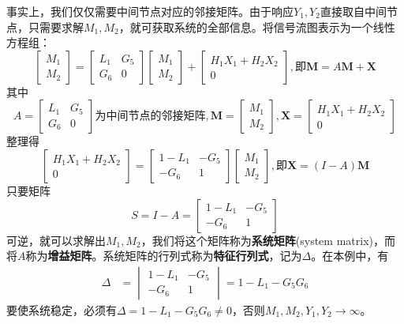 \begin{example}
    事实上，我们仅仅需要中间节点对应的邻接矩阵。由于响应$Y_1,Y_2$直接取自中间节点，只需要求解$M_1,M_2$，就可获取系统的全部信息。将信号流图表示为一个线性方程组：
    \[\begin{bmatrix}
        M_1 \\
        M_2
    \end{bmatrix}=
    \begin{bmatrix}
        L_1 & G_5\\
        G_6 & 0
    \end{bmatrix}
    \begin{bmatrix}
        M_1 \\
        M_2
    \end{bmatrix}+\begin{bmatrix}
        H_1 X_1 + H_2 X_2 \\
        0
    \end{bmatrix},\text{即}\mathbf{M}=A\mathbf{M}+\mathbf{X}\]
    其中$$A=\begin{bmatrix}
        L_1 & G_5\\
        G_6 & 0
    \end{bmatrix}\text{为中间节点的邻接矩阵},\mathbf{M}=\begin{bmatrix}
        M_1 \\
        M_2
    \end{bmatrix},\mathbf{X}=\begin{bmatrix}
        H_1 X_1 + H_2 X_2 \\
        0
    \end{bmatrix}$$
    整理得\[\begin{bmatrix}
        H_1 X_1 + H_2 X_2 \\
        0
    \end{bmatrix}=\begin{bmatrix}
        1 -L_1 & -G_5\\
        -G_6 & 1
    \end{bmatrix}\begin{bmatrix}
        M_1 \\
        M_2
    \end{bmatrix},\text{即}\mathbf{X}=(I-A)\mathbf{M}\]
    只要矩阵\[S=I-A=\begin{bmatrix}
        1 -L_1 & -G_5\\
        -G_6 & 1
    \end{bmatrix}\]
    可逆，就可以求解出$M_1,M_2$，我们将这个矩阵称为\textbf{系统矩阵}(system matrix)，而将$A$称为\textbf{增益矩阵}。系统矩阵的行列式称为\textbf{特征行列式}，记为$\Delta$。在本例中，有\begin{align*}
        \Delta&=\begin{vmatrix}
        1 -L_1 & -G_5 \\
        -G_6 & 1
    \end{vmatrix}=1-L_1-G_5 G_6
    \end{align*}
    要使系统稳定，必须有$\Delta=1-L_1-G_5 G_6\neq 0$，否则$M_1,M_2,Y_1,Y_2\to\infty$。
\end{example}

